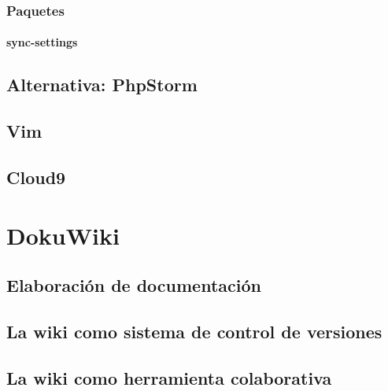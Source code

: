 \documentclass[a4paper,11pt,spanish]{sphinxmanual}
\begin{document}
\subsubsection{Paquetes}
\label{\detokenize{introduccion-al-desarrollo-web:paquetes}}

\paragraph{sync-settings}
\label{\detokenize{introduccion-al-desarrollo-web:sync-settings}}

\subsection{Alternativa: PhpStorm}
\label{\detokenize{introduccion-al-desarrollo-web:alternativa-phpstorm}}

\subsection{Vim}
\label{\detokenize{introduccion-al-desarrollo-web:vim}}

\subsection{Cloud9}
\label{\detokenize{introduccion-al-desarrollo-web:cloud9}}

\section{DokuWiki}
\label{\detokenize{introduccion-al-desarrollo-web:dokuwiki}}

\subsection{Elaboración de documentación}
\label{\detokenize{introduccion-al-desarrollo-web:elaboracion-de-documentacion}}

\subsection{La wiki como sistema de control de versiones}
\label{\detokenize{introduccion-al-desarrollo-web:la-wiki-como-sistema-de-control-de-versiones}}

\subsection{La wiki como herramienta colaborativa}
\label{\detokenize{introduccion-al-desarrollo-web:la-wiki-como-herramienta-colaborativa}}
\end{document}
